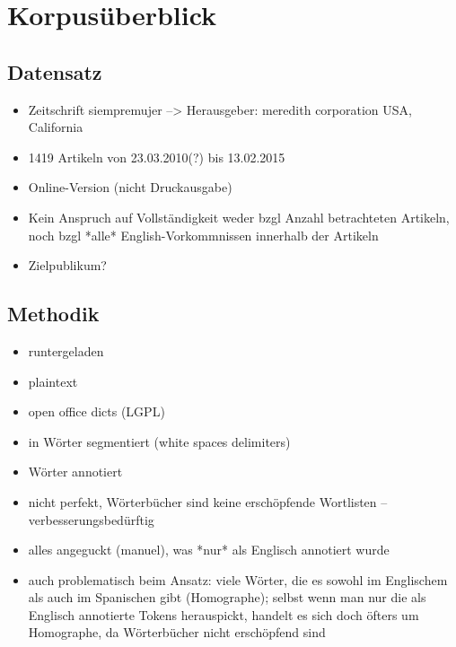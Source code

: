 \section{Korpusüberblick}


\subsection{Datensatz}
\begin{itemize}
  \item Zeitschrift siempremujer --> Herausgeber: meredith corporation USA, California
  \item 1419 Artikeln von 23.03.2010(?) bis 13.02.2015
  \item Online-Version (nicht Druckausgabe)
  \item Kein Anspruch auf Vollständigkeit weder bzgl Anzahl betrachteten Artikeln, noch bzgl *alle* English-Vorkommnissen innerhalb der Artikeln
  \item Zielpublikum?
\end{itemize}

\subsection{Methodik}
\begin{itemize}
  \item runtergeladen
  \item plaintext
  \item open office dicts (LGPL)
  \item in Wörter segmentiert (white spaces delimiters)
  \item Wörter annotiert
  \item nicht perfekt, Wörterbücher sind keine erschöpfende Wortlisten -- verbesserungsbedürftig
  \item alles angeguckt (manuel), was *nur* als Englisch annotiert wurde
  \item auch problematisch beim Ansatz: viele Wörter, die es sowohl im Englischem als auch im Spanischen gibt (Homographe); selbst wenn man nur die als Englisch annotierte Tokens herauspickt, handelt es sich doch öfters um Homographe, da Wörterbücher nicht erschöpfend sind
\end{itemize}
